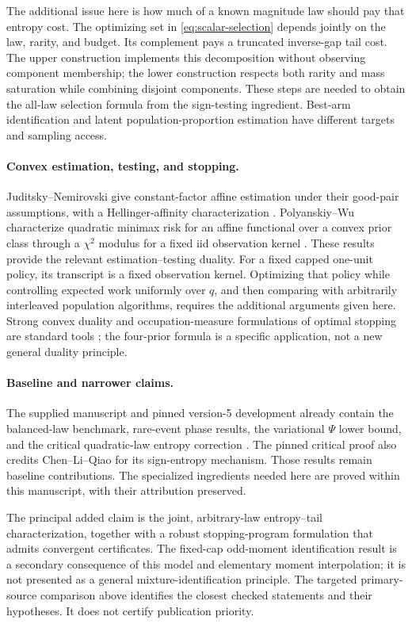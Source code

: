 The additional issue here is how much of a known magnitude law should
pay that entropy cost. The optimizing set in
\eqref{eq:scalar-selection} depends jointly on the law, rarity, and
budget. Its complement pays a truncated inverse-gap tail cost. The
upper construction implements this decomposition without observing
component membership; the lower construction respects both rarity
and mass saturation while combining disjoint components. These steps
are needed to obtain the all-law selection formula from the sign-testing
ingredient. Best-arm identification and latent population-proportion
estimation have different targets and sampling access.

\paragraph{Convex estimation, testing, and stopping.}
Juditsky--Nemirovski give constant-factor affine estimation under their
good-pair assumptions, with a Hellinger-affinity characterization
\cite[Theorem~3.1 and Proposition~3.1]{jn}. Polyanskiy--Wu characterize
quadratic minimax risk for an affine functional over a convex prior
class through a $\chi^2$ modulus for a fixed iid observation kernel
\cite[Theorem~1]{pw}. These results provide the relevant
estimation--testing duality. For a fixed capped one-unit policy, its
transcript is a fixed observation kernel. Optimizing that policy while
controlling expected work uniformly over $q$, and then comparing with
arbitrarily interleaved population algorithms, requires the additional
arguments given here. Strong convex duality and occupation-measure
formulations of optimal stopping are standard tools \cite{bv,cs}; the
four-prior formula is a specific application, not a new general duality
principle.

\paragraph{Baseline and narrower claims.}
The supplied manuscript and pinned version-5 development already
contain the balanced-law benchmark, rare-event phase results, the
variational $\Psi$ lower bound, and the critical quadratic-law entropy
correction \cite{original,repo}. The pinned critical proof also credits
Chen--Li--Qiao for its sign-entropy mechanism. Those results remain baseline contributions. The specialized ingredients
needed here are proved within this manuscript, with their attribution
preserved.

The principal added claim is the joint, arbitrary-law entropy--tail
characterization, together with a robust stopping-program formulation
that admits convergent certificates. The fixed-cap odd-moment
identification result is a secondary consequence of this model and
elementary moment interpolation; it is not presented as a general
mixture-identification principle. The targeted primary-source comparison
above identifies the closest checked statements and their hypotheses.
It does not certify publication priority.
